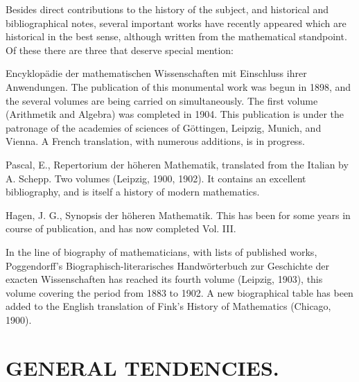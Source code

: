 \documentclass[oneside]{book}
\begin{document}
{Besides direct contributions to the history of the subject, and
historical and bibliographical notes, several important works have
recently appeared which are historical in the best sense, although
written from the mathematical standpoint. Of these there are three
that deserve special mention:

\bigskip

Encyklop\"adie der mathematischen Wissenschaften mit Einschluss
ihrer Anwendungen. The publication of this monumental work was begun
in 1898, and the several volumes are being carried on
simultaneously. The first volume (Arithmetik and Algebra) was
completed in 1904. This publication is under the patronage of the
academies of sciences of G\"ottingen, Leipzig, Munich, and Vienna. A
French translation, with numerous additions, is in progress.

Pascal, E., Repertorium der h\"oheren Mathematik, translated from
the Italian by A. Schepp. Two volumes (Leipzig, 1900, 1902). It
contains an excellent bibliography, and is itself a history of
modern mathematics.

Hagen, J. G., Synopsis der h\"oheren Mathematik. This has been for
some years in course of publication, and has now completed Vol. III.

\bigskip

In the line of biography of mathematicians, with lists of published
works, Poggendorff's Biographisch-literarisches Handw\"orterbuch zur
Geschichte der exacten Wissenschaften has reached its fourth volume
(Leipzig, 1903), this volume covering the period from 1883 to
1902. A new biographical table has been added to the English
translation of Fink's History of Mathematics (Chicago, 1900).

\chapter{GENERAL TENDENCIES.}

}
\end{document}
